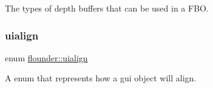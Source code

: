 The types of depth buffers that can be used in a F\+BO. 

\mbox{\label{namespaceflounder_a70f1871d5c05aa8e078dd37501ce10a9}} 
\subsubsection{\texorpdfstring{uialign}{uialign}}
{\footnotesize\ttfamily enum \hyperlink{namespaceflounder_a70f1871d5c05aa8e078dd37501ce10a9}{flounder\+::uialign}}



A enum that represents how a gui object will align. 


